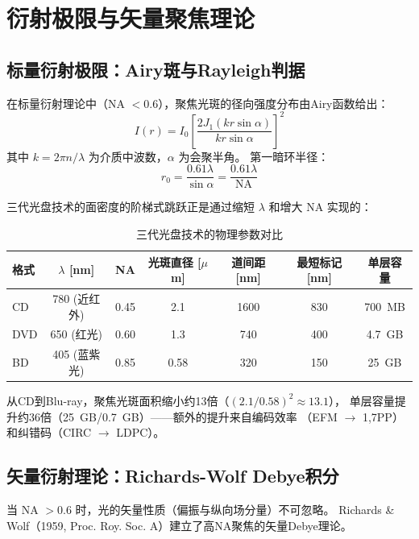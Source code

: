 \documentclass[11pt,a4paper,twoside]{article}
\theoremstyle{definition}\newtheorem{definition}{定义}[section]
\theoremstyle{plain}\newtheorem{theorem}{定理}[section]
\theoremstyle{remark}\newtheorem{remark}{注解}[section]
\begin{document}
\section{衍射极限与矢量聚焦理论}
\label{sec:focus}

\subsection{标量衍射极限：Airy斑与Rayleigh判据}

在标量衍射理论中（NA $< 0.6$），聚焦光斑的径向强度分布由Airy函数给出：
\begin{equation}\label{eq:airy}
  I(r) = I_0 \left[ \frac{2 J_1(k r \sin\alpha)}{k r \sin\alpha} \right]^2
\end{equation}
其中 $k = 2\pi n / \lambda$ 为介质中波数，$\alpha$ 为会聚半角。
第一暗环半径：
\begin{equation}
  r_0 = \frac{0.61 \lambda}{\sin\alpha} = \frac{0.61\lambda}{\text{NA}}
\end{equation}

三代光盘技术的面密度的阶梯式跳跃正是通过缩短 $\lambda$ 和增大 NA 实现的：

\begin{table}[H]
\centering\caption{三代光盘技术的物理参数对比}
\begin{tabular}{@{}lcccccc@{}}
\toprule
格式 & $\lambda$ [nm] & NA & 光斑直径 [$\mu$m] & 道间距 [nm] & 最短标记 [nm] & 单层容量 \\
\midrule
CD   & 780 (近红外) & 0.45 & 2.1  & 1600 & 830  & \SI{700}{MB} \\
DVD  & 650 (红光)   & 0.60 & 1.3  & 740  & 400  & \SI{4.7}{GB} \\
BD   & 405 (蓝紫光) & 0.85 & 0.58 & 320  & 150  & \SI{25}{GB} \\
\bottomrule
\end{tabular}
\end{table}

从CD到Blu-ray，聚焦光斑面积缩小约13倍（$(2.1/0.58)^2 \approx 13.1$），
单层容量提升约36倍（\SI{25}{GB}/\SI{0.7}{GB}）——额外的提升来自编码效率
（EFM $\to$ 1,7PP）和纠错码（CIRC $\to$ LDPC）。

\subsection{矢量衍射理论：Richards-Wolf Debye积分}

当 NA $> 0.6$ 时，光的矢量性质（偏振与纵向场分量）不可忽略。
Richards \& Wolf（1959, Proc. Roy. Soc. A）建立了高NA聚焦的矢量Debye理论。
\end{document}
